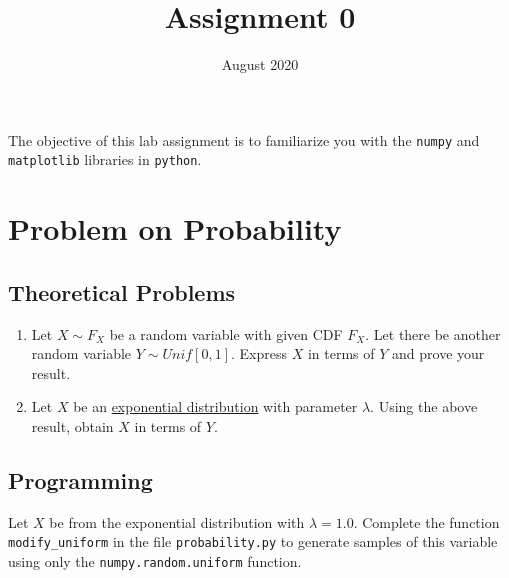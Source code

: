 \documentclass{article}
\title{Assignment 0}
\date{August 2020}
\begin{document}
\maketitle
The objective of this lab assignment is to familiarize you with the \texttt{numpy} and \texttt{matplotlib} libraries in \texttt{python}.



\section{Problem on Probability}
\subsection{Theoretical Problems}
\begin{enumerate}[leftmargin=*, label=(\alph*)]
\item Let $X \sim F_X$ be a random variable with given CDF $F_X$. Let there be another random variable $Y \sim Unif[0,1]$. Express $X$ in terms of $Y$ and prove your result.
\item Let $X$ be an \href{https://en.wikipedia.org/wiki/Exponential_distribution}{exponential distribution} with parameter $\lambda$. Using the above result, obtain $X$ in terms of $Y$.
\end{enumerate}
\subsection{Programming}
Let $X$ be from the exponential distribution with $\lambda = 1.0$. Complete the function \texttt{modify\_uniform} in the file \texttt{probability.py} to generate samples of this variable using only the \texttt{numpy.random.uniform} function. \\
\end{document}
